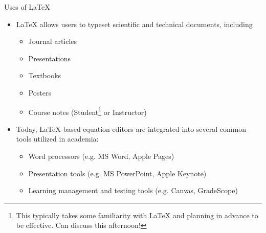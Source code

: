 \documentclass{beamer}
\begin{document}
\begin{frame}{Uses of LaTeX}
	\begin{itemize}
		\item<1-> LaTeX allows users to typeset scientific and technical documents, including
			\begin{itemize}
				\item Journal articles
				\item Presentations
				\item Textbooks
				\item Posters
				\item Course notes (Student\footnote{This typically takes some familiarity with LaTeX and planning in advance to be effective.  Can discuss this afternoon!} or Instructor)
			\end{itemize}
		\item<2-> Today, LaTeX-based equation editors are integrated into several common tools utilized in academia:
			\begin{itemize}
				\item Word processors (e.g. MS Word, Apple Pages)
				\item Presentation tools (e.g. MS PowerPoint, Apple Keynote)
				\item Learning management and testing tools (e.g. Canvas, GradeScope)
			\end{itemize}
	\end{itemize}
\end{frame}
\end{document}
